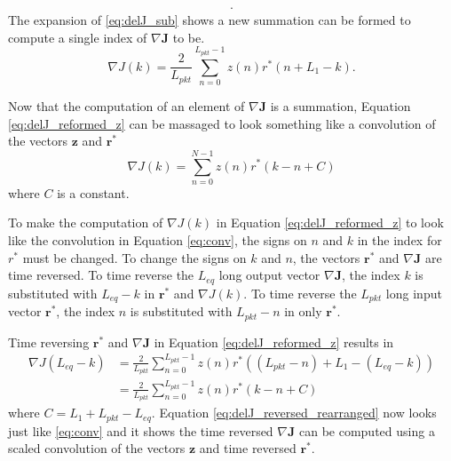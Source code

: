\begin{multline}
\label{eq:delJ_writeout}.
\end{multline}
The expansion of \eqref{eq:delJ_sub} shows a new summation can be formed to compute a single index of $\nabla \mathbf{J}$ to be. 
\begin{equation}
	\nabla J(k) = \frac{2}{L_{pkt}} \sum_{n=0}^{L_{pkt}-1} z(n) r^\ast(n+L_1-k).
	\label{eq:delJ_reformed_z}
\end{equation}

Now that the computation of an element of $\nabla \mathbf{J}$ is a summation, Equation \eqref{eq:delJ_reformed_z} can be massaged to look something like a convolution of the vectors $\mathbf{z}$ and $\mathbf{r}^\ast$
\begin{equation}
\nabla J(k) = \sum_{n=0}^{N-1} z(n) r^\ast(k-n+C)
\label{eq:conv}
\end{equation}
where $C$ is a constant. 

To make the computation of $\nabla J(k)$ in Equation \eqref{eq:delJ_reformed_z} to look like the convolution in Equation \eqref{eq:conv}, the signs on $n$ and $k$ in the index for $r^\ast$ must be changed.
To change the signs on $k$ and $n$, the vectors $\mathbf{r}^\ast$ and $\nabla \mathbf{J}$ are time reversed.
To time reverse the $L_{eq}$ long output vector $\nabla \mathbf{J}$, the index $k$ is substituted with $L_{eq} - k$ in $\mathbf{r}^\ast$ and $\nabla J(k)$. 
To time reverse the $L_{pkt}$ long input vector $\mathbf{r}^\ast$, the index $n$ is substituted with $L_{pkt} - n$ in only $\mathbf{r}^\ast$. 

Time reversing $\mathbf{r}^\ast$ and $\nabla \mathbf{J}$ in Equation \eqref{eq:delJ_reformed_z} results in 
\begin{align}
	\nabla J(L_{eq} - k) 	&= \frac{2}{L_{pkt}} \sum_{n=0}^{L_{pkt}-1} z(n) r^\ast((L_{pkt} - n)+L_1-(L_{eq} - k))\nonumber\\
							&= \frac{2}{L_{pkt}} \sum_{n=0}^{L_{pkt}-1} z(n) r^\ast(k-n+C)
	\label{eq:delJ_reversed_rearranged}
\end{align}
where $C = L_1+L_{pkt}-L_{eq}$.
Equation \eqref{eq:delJ_reversed_rearranged} now looks just like \eqref{eq:conv} and it shows the time reversed $\nabla \mathbf{J}$ can be computed using a scaled convolution of the vectors $\mathbf{z}$ and time reversed $\mathbf{r}^\ast$.

%
